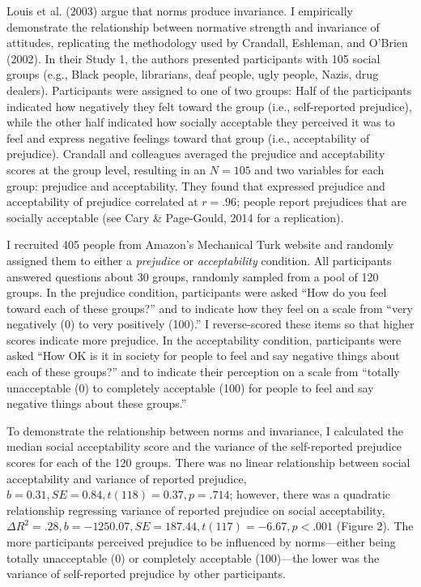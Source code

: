 \documentclass[english,man]{apa6}
\newcounter{author}
\theoremstyle{definition}
\theoremstyle{definition}
\theoremstyle{remark}
\begin{document}
Louis et al. (2003) argue that norms produce invariance. I empirically
demonstrate the relationship between normative strength and invariance
of attitudes, replicating the methodology used by Crandall, Eshleman,
and O'Brien (2002). In their Study 1, the authors presented participants
with 105 social groups (e.g., Black people, librarians, deaf people,
ugly people, Nazis, drug dealers). Participants were assigned to one of
two groups: Half of the participants indicated how negatively they felt
toward the group (i.e., self-reported prejudice), while the other half
indicated how socially acceptable they perceived it was to feel and
express negative feelings toward that group (i.e., acceptability of
prejudice). Crandall and colleagues averaged the prejudice and
acceptability scores at the group level, resulting in an \(N = 105\) and
two variables for each group: prejudice and acceptability. They found
that expressed prejudice and acceptability of prejudice correlated at
\(r = .96\); people report prejudices that are socially acceptable (see
Cary \& Page-Gould, 2014 for a replication).

I recruited 405 people from Amazon's Mechanical Turk website and
randomly assigned them to either a \emph{prejudice} or
\emph{acceptability} condition. All participants answered questions
about 30 groups, randomly sampled from a pool of 120 groups. In the
prejudice condition, participants were asked \enquote{How do you feel
toward each of these groups?} and to indicate how they feel on a scale
from \enquote{very negatively (0) to very positively (100).} I
reverse-scored these items so that higher scores indicate more
prejudice. In the acceptability condition, participants were asked
\enquote{How OK is it in society for people to feel and say negative
things about each of these groups?} and to indicate their perception on
a scale from \enquote{totally unacceptable (0) to completely acceptable
(100) for people to feel and say negative things about these groups.}

To demonstrate the relationship between norms and invariance, I
calculated the median social acceptability score and the variance of the
self-reported prejudice scores for each of the 120 groups. There was no
linear relationship between social acceptability and variance of
reported prejudice, \(b = 0.31, SE = 0.84, t(118) = 0.37, p = .714\);
however, there was a quadratic relationship regressing variance of
reported prejudice on social acceptability,
\(\Delta R^2 = .28, b = -1250.07, SE = 187.44, t(117) = -6.67, p < .001\)
(Figure 2). The more participants perceived prejudice to be influenced
by norms---either being totally unacceptable (0) or completely
acceptable (100)---the lower was the variance of self-reported prejudice
by other participants.
\end{document}
